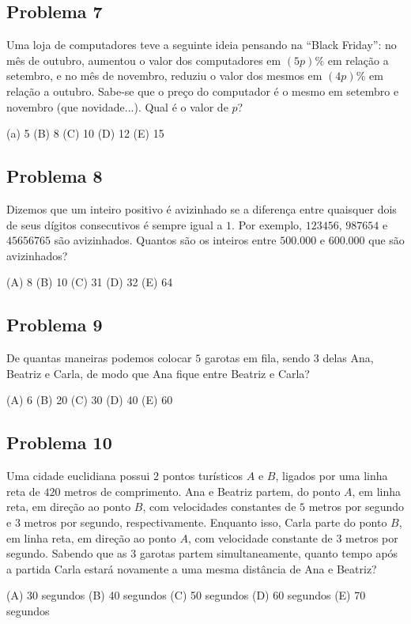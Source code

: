 \documentclass[12pt]{article}
\begin{document}
\subsection{Problema 7}
\begin{tcolorbox}[statementbox]
Uma loja de computadores teve a seguinte ideia pensando na “Black Friday”: no mês de outubro, aumentou o valor dos computadores em $(5p)\%$ em relação a setembro, e no mês de novembro, reduziu o valor dos mesmos em $(4p)\%$ em relação a outubro. Sabe-se que o preço do computador é o mesmo em setembro e novembro (que novidade...). Qual é o valor de $p$?

(a) 5 (B) 8 (C) 10 (D) 12 (E) 15
\end{tcolorbox}
\clearpage

\subsection{Problema 8}
\begin{tcolorbox}[statementbox]
Dizemos que um inteiro positivo é avizinhado se a diferença entre quaisquer dois de seus dígitos consecutivos é sempre igual a $1$. Por exemplo, $123456$, $987654$ e $45656765$ são avizinhados. Quantos são os inteiros entre $500{.}000$ e $600{.}000$ que são avizinhados?

(A) 8 (B) 10 (C) 31 (D) 32 (E) 64
\end{tcolorbox}
\clearpage

\subsection{Problema 9}
\begin{tcolorbox}[statementbox]
De quantas maneiras podemos colocar $5$ garotas em fila, sendo $3$ delas Ana, Beatriz e Carla, de modo que Ana fique entre Beatriz e Carla?

(A) 6 (B) 20 (C) 30 (D) 40 (E) 60
\end{tcolorbox}
\clearpage

\subsection{Problema 10}
\begin{tcolorbox}[statementbox]
Uma cidade euclidiana possui $2$ pontos turísticos $A$ e $B$, ligados por uma linha reta de $420$ metros de comprimento. Ana e Beatriz partem, do ponto $A$, em linha reta, em direção ao ponto $B$, com velocidades constantes de $5$ metros por segundo e $3$ metros por segundo, respectivamente. Enquanto isso, Carla parte do ponto $B$, em linha reta, em direção ao ponto $A$, com velocidade constante de $3$ metros por segundo. Sabendo que as $3$ garotas partem simultaneamente, quanto tempo após a partida Carla estará novamente a uma mesma distância de Ana e Beatriz?

(A) 30 segundos (B) 40 segundos (C) 50 segundos (D) 60 segundos (E) 70 segundos
\end{tcolorbox}
\clearpage
\end{document}
